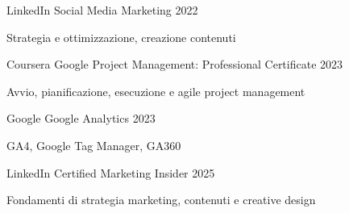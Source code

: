 
\begin{cventries}

\cventry
{LinkedIn} %
{Social Media Marketing}
{} %
{2022} %
{
\begin{cvitems} %
\item Strategia e ottimizzazione, creazione contenuti
\end{cvitems}
}

\cventry
{Coursera}
{Google Project Management: Professional Certificate} %
{} %
{2023} %
{
\begin{cvitems} %
\item Avvio, pianificazione, esecuzione e agile project management
\end{cvitems}
}

\cventry
{Google}
{Google Analytics} %
{} %
{2023} %
{
\begin{cvitems} %
\item GA4, Google Tag Manager, GA360
\end{cvitems}
}

\cventry
{LinkedIn} %
{Certified Marketing Insider}
{} %
{2025} %
{
\begin{cvitems} %
\item Fondamenti di strategia marketing, contenuti e creative design
\end{cvitems}
}




\end{cventries}
